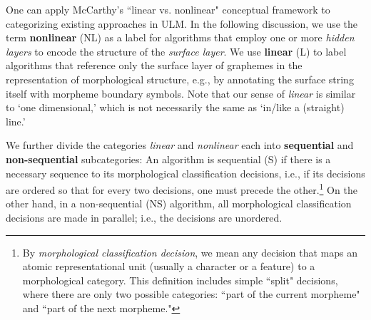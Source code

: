 
One can apply McCarthy's ``linear vs. nonlinear" conceptual framework to categorizing existing approaches in ULM.
In the following discussion, we
use the term \textbf{nonlinear} (NL) as a label for algorithms that employ one
or more \textit{hidden layers} to encode the structure of the
\textit{surface layer}.
We use \textbf{linear} (L) %
to label
algorithms that reference only the surface layer of graphemes in the representation of
morphological structure, e.g., by annotating the
surface string itself with morpheme boundary symbols. Note that our sense of \textit{linear} 
is similar to `one dimensional,' which is not necessarily the same as `in/like a (straight) line.'
%

We further divide the categories
\textit{linear} and \textit{nonlinear} each into
\textbf{sequential} and \textbf{non-sequential} subcategories:
An algorithm is sequential (S) if there is a necessary sequence to its morphological classification decisions, 
i.e., if its decisions are ordered so that for every two decisions, one must precede the other.\footnote{By \textit{morphological 
classification decision}, we mean any decision that maps an atomic representational unit (usually a character or a feature) to a morphological category. This definition includes simple ``split" decisions, where there are only two possible categories: ``part of the current morpheme" and ``part of the next morpheme."}
On the other hand, in a non-sequential (NS) algorithm, all morphological classification decisions are made in parallel; i.e., the decisions are unordered.

